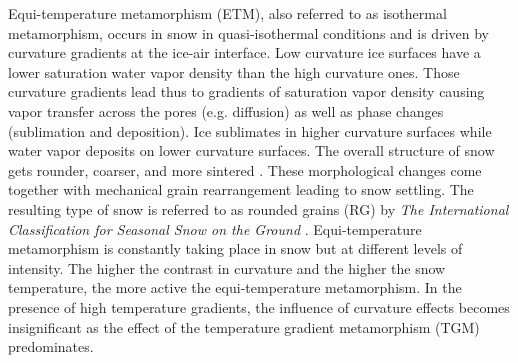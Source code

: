 \documentclass[draft,ms]{agujournal2019}
\begin{document}
Equi-temperature metamorphism (ETM), also referred to as isothermal metamorphism, occurs in snow in quasi-isothermal conditions and is driven by curvature gradients at the ice-air interface. Low curvature ice surfaces have a lower saturation water vapor density than the high curvature ones. Those curvature gradients lead thus to gradients of saturation vapor density causing vapor transfer across the pores (e.g. diffusion) as well as phase changes (sublimation and deposition). Ice sublimates in higher curvature surfaces while water vapor deposits on lower curvature surfaces. 
The overall structure of snow gets rounder, coarser, and more sintered \cite{colbeck_thermodynamics_1980}. These morphological changes come together with mechanical grain rearrangement leading to snow settling. The resulting type of snow is referred to as rounded grains (RG) by \textit{The International Classification for Seasonal Snow on the Ground} \cite{fierz2009international}. Equi-temperature metamorphism is constantly taking place in snow but at different levels of intensity. The higher the contrast in curvature and the higher the snow temperature, the more active the equi-temperature metamorphism. In the presence of high temperature gradients, the influence of curvature effects becomes insignificant as the effect of the temperature gradient metamorphism (TGM) predominates.\\
\end{document}
